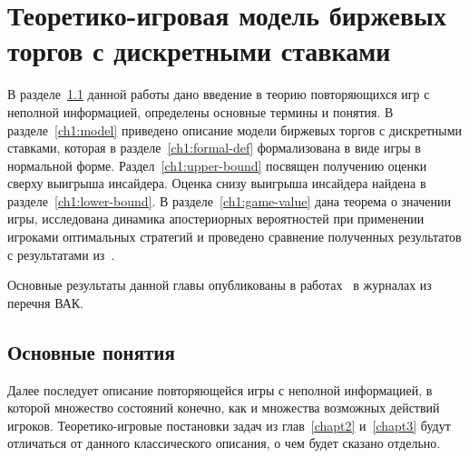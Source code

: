 \chapter{Теоретико-игровая модель биржевых торгов с дискретными ставками} \label{chapt1} 
{
\newcommand{\generalGame}[2]{G_{#1}^m\left({#2}\right)}
\newcommand{\infiniteGame}[1]{G_{\infty}^m\left({#1}\right)}
\newcommand{\firstPlayerPayoff}[4]{K_{#1}^m\left({#2}, {#3}, {#4}\right)}
\newcommand{\infiniteFirstPlayerPayoff}[3]{K_{\infty}^m\left({#1}, {#2}, {#3}\right)}
\newcommand{\gameValue}[2]{V_{#1}^m\left({#2}\right)}
\newcommand{\infiniteGameValue}[1]{V_{\infty}^m\left({#1}\right)}
\newcommand{\symm}[1]{\overline{#1}}
\newcommand{\symmGameExpression}[2][\infty]{G_{#1}^{m, \DCo}\left({#2}\right)}
\newcommand{\upperBound}[1]{H_{\infty}^m\left({#1}\right)}
\newcommand{\fGeneral}[2][1]{\sigma_{#1}^{#2}}
\newcommand{\pEven}[1][k]{p^0_{#1}}
\newcommand{\pOdd}[1][k]{p^{\beta}_{#1}}
\newcommand{\fEven}[1][k]{\phi^0_{#1}}
\newcommand{\fOdd}[1][k]{\phi^{\beta}_{#1}}
\newcommand{\fOpt}{\sigma^*}
\newcommand{\lowerBound}[2][\infty]{L_{#1}^m\left({#2}\right)}

В разделе~\ref{ch1:intro} данной работы дано введение в теорию повторяющихся игр с неполной информацией, определены основные термины и понятия.
В разделе~\ref{ch1:model} приведено описание модели биржевых торгов с дискретными ставками, которая в разделе~\ref{ch1:formal-def} формализована в виде игры в нормальной форме.
Раздел~\ref{ch1:upper-bound} посвящен получению оценки сверху выигрыша инсайдера.
Оценка снизу выигрыша инсайдера найдена в разделе~\ref{ch1:lower-bound}.
В разделе~\ref{ch1:game-value} дана теорема о значении игры, исследована динамика апостериорных вероятностей при применении игроками оптимальных стратегий и проведено сравнение полученных результатов с результатами из~\cite{domansky07}.

Основные результаты данной главы опубликованы в работах~\cite{pyanykh14,pyanykh16:discr:ru} в журналах из перечня ВАК.

\section{Основные понятия}\label{ch1:intro}
Далее последует описание повторяющейся игры с неполной информацией, в которой множество состояний конечно, как и множества возможных действий игроков.
Теоретико-игровые постановки задач из глав~\ref{chapt2} и~\ref{chapt3} будут отличаться от данного классического описания, о чем будет сказано отдельно.

}
